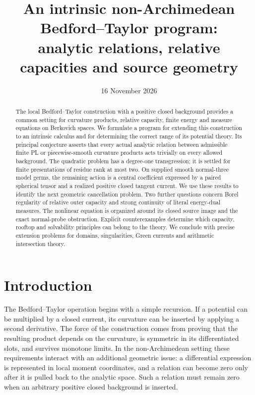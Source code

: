 \documentclass[11pt,a4paper]{article}
\title{An intrinsic non-Archimedean Bedford--Taylor program:\\
 analytic relations, relative capacities and source geometry}
\author{}
\date{16 November 2026}
\theoremstyle{definition}
\theoremstyle{remark}
\numberwithin{equation}{section}
\begin{document}
\maketitle
\begin{abstract}
The local Bedford--Taylor construction with a positive closed background
provides a common setting for curvature products, relative capacity,
finite energy and measure equations on Berkovich spaces.  We formulate a
program for extending this construction to an intrinsic calculus and for
determining the correct range of its potential theory.  Its principal
conjecture asserts that every actual analytic relation between admissible
finite PL or piecewise-smooth curvature products acts trivially on every allowed
background.  The quadratic problem has a degree-one transgression; it is
settled for finite presentations of residue rank at most two.  On supplied
smooth normal-three model germs, the remaining action is a central
coefficient expressed by a paired spherical tensor and a realized positive
closed tangent current.  We use these results to identify the next
geometric cancellation problem.  Two further questions concern Borel
regularity of relative outer capacity and strong continuity of literal
energy-dual measures.  The nonlinear equation is organized around its
closed source image and the exact normal-probe obstruction.  Explicit
counterexamples determine which capacity, rooftop and solvability
principles can belong to the theory.  We conclude with precise extension
problems for domains, singularities, Green currents and arithmetic
intersection theory.
\end{abstract}
\clearpage

{\hypersetup{linkcolor=SectionLink}\tableofcontents}
\clearpage

\section{Introduction}
\label{sec:introduction}

The Bedford--Taylor operation begins with a simple recursion.  If a
potential can be multiplied by a closed current, its curvature can be
inserted by applying a second derivative.  The force of the construction
comes from proving that the resulting product depends on the curvature,
is symmetric in its differentiated slots, and survives monotone limits.
In the non-Archimedean setting these requirements interact with an
additional geometric issue: a differential expression is represented in
local moment coordinates, and a relation can become zero only after it
is pulled back to the analytic space.  Such a relation must remain zero
when an arbitrary positive closed background is inserted.
\end{document}
